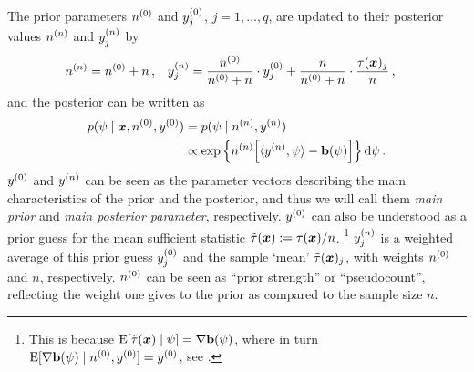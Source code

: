 \documentclass[12pt,a4paper	,twoside]{article}
\newcommand{\dd}{\,\mathrm{d}}
\newcommand{\mbf}[1]{\mathbf{#1}}
\newcommand{\bs}[1]{\boldsymbol{#1}}
\renewcommand{\vec}[1]{{\bs#1}}
\newcommand{\E}{\operatorname{E}}
\begin{document}
The prior parameters $n^{(0)}$ and $y^{(0)}_j$, $j=1,\ldots,q$, are updated to their posterior values $n^{(n)}$ and $y^{(n)}_j$ by
\begin{align}\label{eq:canonicalupdate-q}
\nn   &= \nz + n\,, &
\yn_j &= \frac{\nz}{\nz + n} \cdot \yz_j + \frac{n}{\nz + n} \cdot \frac{\tau(\vec{x})_j}{n}\,,
\end{align}
and the posterior can be written as
\begin{align}
\label{eq:canonicalposterior-q}
p(\psi \mid \vec{x}, \nz, \yz)
 &= p(\psi \mid \nn, \yn) \nonumber\\
 &\propto \exp\Big\{ \nn \Big[ \langle \yn, \psi \rangle - \mbf{b}(\psi) \Big] \Big\} \dd\psi\,.
\end{align}
$y^{(0)}$ and $y^{(n)}$ can be seen as the parameter vectors describing the main characteristics of the prior and the posterior,
and thus we will call them \emph{main prior} and \emph{main posterior parameter}, respectively.
$y^{(0)}$ can also be understood as a prior guess for the mean sufficient statistic $\ttau(\vec{x}) := \tau(\vec{x})/n$.%
\footnote{This is because $\E[\ttau(\vec{x}) \mid \psi] = \nabla\mbf{b}(\psi)$,
where in turn $\E[\nabla\mbf{b}(\psi) \mid \nz, \yz] = \yz$, see \textcite[Prop.~5.7, p.~275]{2000:bernardosmith}.}
$y^{(n)}_j$ is a weighted average of this prior guess $y^{(0)}_j$ and the sample `mean' $\ttau(\vec{x})_j$,
with weights $n^{(0)}$ and $n$, respectively.
$n^{(0)}$ can be seen as ``prior strength'' or ``pseudocount'',
reflecting the weight one gives to the prior as compared to the sample size $n$.


\printbibliography
\end{document}
